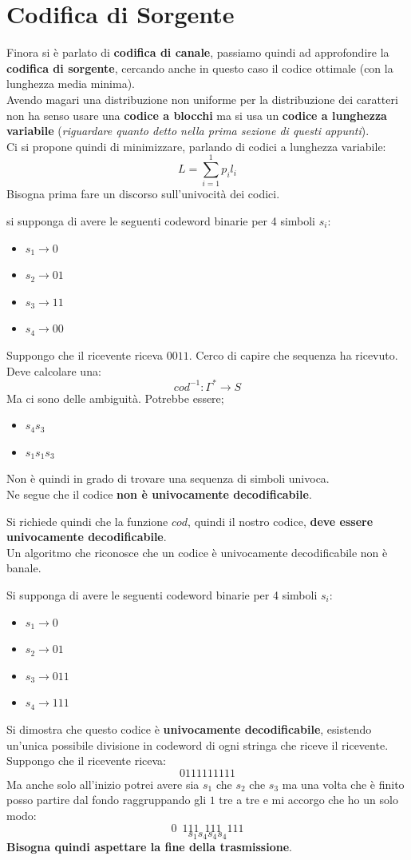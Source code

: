 \documentclass[a4paper,12pt, oneside]{book}
\begin{document}
\section{Codifica di Sorgente}
Finora si è parlato di \textbf{codifica di canale}, passiamo quindi ad
approfondire la \textbf{codifica di sorgente}, cercando anche in questo caso il
codice ottimale (con la lunghezza media minima).\\
Avendo magari una distribuzione non uniforme per la distribuzione dei caratteri
non ha senso usare una \textbf{codice a blocchi} ma si usa un 
\textbf{codice a lunghezza variabile} (\textit{riguardare quanto detto nella
  prima sezione di questi appunti}).\\
Ci si propone quindi di minimizzare, parlando di codici a lunghezza variabile:
\[L=\sum_{i=1}^1 p_il_i\]
Bisogna prima fare un discorso sull'univocità dei codici.
\begin{esempio}
  si supponga di avere le seguenti codeword binarie per 4 simboli $s_i$:
  \begin{itemize}
    \item $s_1\to 0$
    \item $s_2\to 01$
    \item $s_3\to 11$
    \item $s_4\to 00$
  \end{itemize}
  Suppongo che il ricevente riceva $0011$. Cerco di capire che sequenza ha
  ricevuto. Deve calcolare una:
  \[cod^{-1}:\Gamma^*\to S\]
  Ma ci sono delle ambiguità. Potrebbe essere;
  \begin{itemize}
    \item $s_4s_3$
    \item $s_1s_1s_3$
  \end{itemize}
  Non è quindi in grado di trovare una sequenza di simboli univoca.\\
  Ne segue che il codice \textbf{non è univocamente decodificabile}.
\end{esempio}
Si richiede quindi che la funzione $cod$, quindi il nostro codice, \textbf{deve
  essere univocamente decodificabile}. \\
Un algoritmo che riconosce che un codice è univocamente decodificabile non è
banale.
\begin{esempio}
  Si supponga di avere le seguenti codeword binarie per 4 simboli $s_i$:
  \begin{itemize}
    \item $s_1\to 0$
    \item $s_2\to 01$
    \item $s_3\to 011$
    \item $s_4\to 111$
  \end{itemize}
  Si dimostra che questo codice è \textbf{univocamente decodificabile},
  esistendo un'unica possibile divisione in codeword di ogni stringa che riceve
  il ricevente.\\
  Suppongo che il ricevente riceva:
  \[0111111111\]
  Ma anche solo all'inizio potrei avere sia $s_1$ che $s_2$ che $s_3$ ma una
  volta che è finito posso partire dal fondo raggruppando gli $1$ tre a tre e mi
  accorgo che ho un solo modo:
  \[0\,\,\,111\,\,\,111\,\,\,111\]
  \[s_1s_4s_4s_4\]
  \textbf{Bisogna quindi aspettare la fine della trasmissione}.
\end{esempio}
\end{document}
